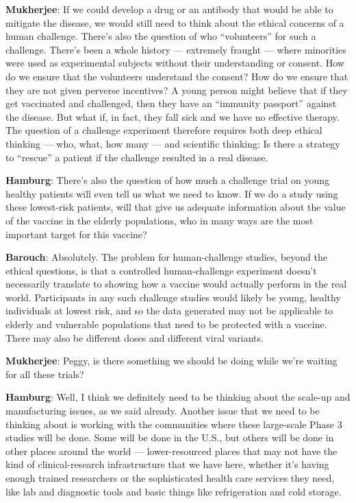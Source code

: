 \textbf{Mukherjee}: If we could develop a drug or an antibody that would
be able to mitigate the disease, we would still need to think about the
ethical concerns of a human challenge. There's also the question of who
``volunteers'' for such a challenge. There's been a whole history ---
extremely fraught --- where minorities were used as experimental
subjects without their understanding or consent. How do we ensure that
the volunteers understand the consent? How do we ensure that they are
not given perverse incentives? A young person might believe that if they
get vaccinated and challenged, then they have an ``immunity passport''
against the disease. But what if, in fact, they fall sick and we have no
effective therapy. The question of a challenge experiment therefore
requires both deep ethical thinking --- who, what, how many --- and
scientific thinking: Is there a strategy to ``rescue'' a patient if the
challenge resulted in a real disease.

\textbf{Hamburg}: There's also the question of how much a challenge
trial on young healthy patients will even tell us what we need to know.
If we do a study using these lowest-risk patients, will that give us
adequate information about the value of the vaccine in the elderly
populations, who in many ways are the most important target for this
vaccine?

\textbf{Barouch}: Absolutely. The problem for human-challenge studies,
beyond the ethical questions, is that a controlled human-challenge
experiment doesn't necessarily translate to showing how a vaccine would
actually perform in the real world. Participants in any such challenge
studies would likely be young, healthy individuals at lowest risk, and
so the data generated may not be applicable to elderly and vulnerable
populations that need to be protected with a vaccine. There may also be
different doses and different viral variants.

\textbf{Mukherjee}: Peggy, is there something we should be doing while
we're waiting for all these trials?

\textbf{Hamburg}: Well, I think we definitely need to be thinking about
the scale-up and manufacturing issues, as we said already. Another issue
that we need to be thinking about is working with the communities where
these large-scale Phase 3 studies will be done. Some will be done in the
U.S., but others will be done in other places around the world ---
lower-resourced places that may not have the kind of clinical-research
infrastructure that we have here, whether it's having enough trained
researchers or the sophisticated health care services they need, like
lab and diagnostic tools and basic things like refrigeration and cold
storage.

